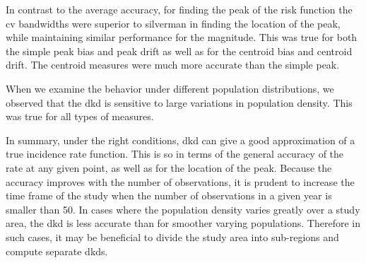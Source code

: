 In contrast to the average accuracy,
for finding the peak of the risk function
the \gls{cv} bandwidths were superior to \gls{silverman}
in finding the location of the peak,
while maintaining similar performance for the magnitude.
This was true for both the simple \gls{peak bias} and \gls{peak drift} as well as for the
\gls{centroid bias} and \gls{centroid drift}.
The centroid measures were much more accurate than the simple peak.

When we examine the behavior under different population distributions,
we observed that the \gls{dkd} is sensitive to large variations in population density.
This was true for all types of measures.

In summary,
under the right conditions,
\gls{dkd} can give a good approximation of a true \gls{incidence rate} function.
This is so in terms of the general accuracy of the rate at any given point,
as well as for the location of the peak.
Because the accuracy improves with the number of observations,
it is prudent to increase the time frame of the study when the number of observations in a given year is smaller than 50.
In cases where the population density varies greatly over a study area,
the \gls{dkd} is less accurate than for smoother varying populations.
Therefore in such cases,
it may be beneficial to divide the study area into sub-regions and compute separate \glspl{dkd}.
